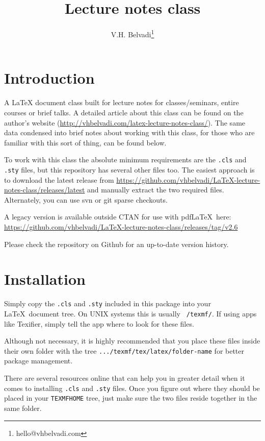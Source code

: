 \documentclass[a4paper,margin=1in]{article}
\title{Lecture notes class}
\author{V.H. Belvadi\thanks{hello@vhbelvadi.com}}
\begin{document}
\maketitle
\tableofcontents

\section{Introduction}

A LaTeX document class built for lecture notes for classes/seminars, entire courses or brief talks. A detailed article about this class can be found on the author's website (\url{http://vhbelvadi.com/latex-lecture-notes-class/}). The same data condensed into brief notes about working with this class, for those who are familiar with this sort of thing, can be found below.

To work with this class the absolute minimum requirements are the \texttt{.cls} and \texttt{.sty} files, but this repository has several other files too. The easiest approach is to download the latest release from \url{https://github.com/vhbelvadi/LaTeX-lecture-notes-class/releases/latest} and manually extract the two required files. Alternately, you can use svn or git sparse checkouts.

A legacy version is available outside CTAN for use with pdf\LaTeX\ here: \url{https://github.com/vhbelvadi/LaTeX-lecture-notes-class/releases/tag/v2.6}

Please check the repository on Github for an up-to-date version history.

\section{Installation}

Simply copy the \texttt{.cls} and \texttt{.sty} included in this package into your \LaTeX\ document tree. On UNIX systems this is usually \texttt{~/texmf/}. If using apps like Texifier, simply tell the app where to look for these files.

Although not necessary, it is highly recommended that you place these files inside their own folder with the tree \texttt{.../texmf/tex/latex/folder-name} for better package management.

There are several resources online that can help you in greater detail when it comes to installing \texttt{.cls} and \texttt{.sty} files. Once you figure out where they should be placed in your \texttt{TEXMFHOME} tree, just make sure the two files reside together in the same folder.
\end{document}
